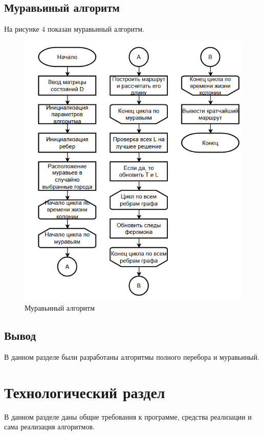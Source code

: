 \documentclass[14pt, a4paper]{extarticle}
\begin{document}
\subsection{Муравьиный алгоритм}
На рисунке 4 показан муравьиный алгоритм.
\begin{figure}[h!]
	\centering
	\includegraphics[scale=1]{source/Ant.png}
	\caption{Муравьиный алгоритм}
\end{figure}
\subsection{Вывод}
В данном разделе были разработаны алгоритмы полного перебора и муравьиный.

\newpage
\section{Технологический раздел}
В данном разделе даны общие требования к программе, средства реализации и сама реализация алгоритмов.
\end{document}
